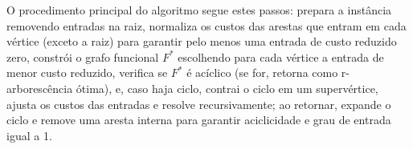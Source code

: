 % 

% 

% 

% 

% 


O procedimento principal do algoritmo segue estes passos: prepara a instância removendo entradas na raiz, normaliza os custos das arestas que entram em cada vértice (exceto a raiz) para garantir pelo menos uma entrada de custo reduzido zero, constrói o grafo funcional $F^*$ escolhendo para cada vértice a entrada de menor custo reduzido, verifica se $F^*$ é acíclico (se for, retorna como r-arborescência ótima), e, caso haja ciclo, contrai o ciclo em um supervértice, ajusta os custos das entradas e resolve recursivamente; ao retornar, expande o ciclo e remove uma aresta interna para garantir aciclicidade e grau de entrada igual a 1.


